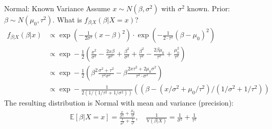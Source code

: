 \documentclass[aspectratio=169]{beamer}
\begin{document}
\begin{frame}{Normal: Known Variance}
Assume $x \sim N(\beta,\sigma^2)$ with $\sigma^2$ known. Prior: $\beta \sim N(\mu_0,\tau^2)$. What is $f_{\beta | X}(\beta | X=x)$?
\begin{align*}
f_{\beta|X}(\beta | x) &\propto \exp \left(-\frac{1}{2 \sigma^{2}}(x-\beta)^{2}\right) \cdot \exp \left(-\frac{1}{2 \cdot \tau^{2}}\left(\beta-\mu_{0}\right)^{2}\right)\\
&\propto \exp -\frac{1}{2}\left(\frac{x^{2}}{\sigma^{2}}-\frac{2 x \beta}{\sigma^{2}}+\frac{\beta^{2}}{\sigma^{2}}+\frac{\beta^{2}}{\tau^{2}}-\frac{2 \beta \mu_{0}}{\tau^{2}}+\frac{\mu_{0}^{2}}{\tau^{2}}\right)\\
&\propto \exp -\frac{1}{2}\left(\beta^{2} \frac{\sigma^{2}+\tau^{2}}{\tau^{2} \sigma^{2}}-\beta \frac{2 x \tau^{2}+2 \mu_{0} \sigma^{2}}{\tau^{2} \cdot \sigma^{2}}\right)\\
&\propto \exp -\frac{1}{2\left(1 /\left(1 / \tau^{2}+1 / \sigma^{2}\right)\right)}\left(\left(\beta-\left(x / \sigma^{2}+\mu_{0} / \tau^{2}\right) /\left(1 / \sigma^{2}+1 / \tau^{2}\right)\right)\right.
\end{align*}
The resulting distribution is Normal with mean and variance (precision):
\begin{align*}
\mathbb{E}[\beta | X=x]=\frac{\frac{x}{\sigma^{2}}+\frac{\mu_{0}}{\tau^{2}}}{\frac{1}{\sigma^{2}}+\frac{1}{\tau^{2}}}, \quad \frac{1}{\mathbb{V}(\beta | X)}=\frac{1}{\sigma^{2}}+\frac{1}{\tau^{2}}
\end{align*}
\end{frame}
\end{document}
